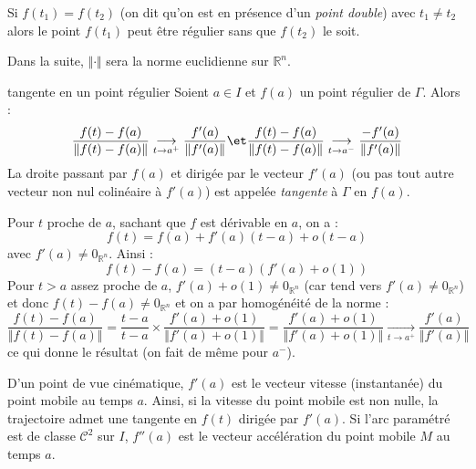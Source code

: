 \documentclass[french,11pt,twoside]{VcCours}
\begin{document}
\begin{Remarque}[\alerte]{}
	Si $f(t_1) = f(t_2)$ (on dit qu'on est en présence d'un \emph{point double}) avec $t_1 \neq t_2$ alors le point $f(t_1)$ peut être régulier sans que $f(t_2)$ le soit.
\end{Remarque}

\medskip

Dans la suite, $\Vert \cdot \Vert$ sera la norme euclidienne sur $\mathbb{R}^n$.

\medskip

\begin{TheoremeDefinition}{tangente en un point régulier}
Soient $a \in I$ et $f(a)$ un point régulier de $\Gamma$. Alors :
$$ \dfrac{f(t)-f(a)}{\Vert f(t)-f(a) \Vert} \underset{t \rightarrow a^+}{\longrightarrow} \frac{f'(a)}{\Vert f'(a) \Vert} \et  \dfrac{f(t)-f(a)}{\Vert f(t)-f(a) \Vert} \underset{t \rightarrow a^-}{\longrightarrow} \frac{-f'(a)}{\Vert f'(a) \Vert}$$
La droite passant par $f(a)$ et dirigée par le vecteur $f'(a)$ (ou pas tout autre vecteur non nul colinéaire à $f'(a)$) est appelée \emph{tangente} à $\Gamma$ en $f(a)$.
\end{TheoremeDefinition}

\begin{Demonstration}{} Pour $t$ proche de $a$, sachant que $f$ est dérivable en $a$, on a :
$$ f(t)=f(a)+f'(a)(t-a)+o(t-a)$$
avec $f'(a) \neq 0_{\mathbb{R}^n}$. Ainsi :
$$ f(t)-f(a)= (t-a) (f'(a)+o(1))$$
Pour $t>a$ assez proche de $a$, $f'(a)+o(1) \neq  0_{\mathbb{R}^n}$ (car tend vers $f'(a) \neq  0_{\mathbb{R}^n}$) et donc $f(t)-f(a) \neq  0_{\mathbb{R}^n}$ et on a par homogénéité de la norme :
$$  \dfrac{f(t)-f(a)}{\Vert f(t)-f(a) \Vert} = \frac{t-a}{t-a} \times \frac{f'(a)+o(1)}{\Vert f'(a)+o(1)\Vert} = \frac{f'(a)+o(1)}{\Vert f'(a)+o(1)\Vert} \underset{t \rightarrow  a^+}{\longrightarrow} \frac{f'(a)}{\Vert f'(a) \Vert}$$
ce qui donne le résultat (on fait de même pour $a^{-}$).
\end{Demonstration}

\medskip

\begin{Remarque}{}
D'un point de vue cinématique, $f'(a)$ est le vecteur vitesse (instantanée) du point mobile au temps $a$. Ainsi, si la vitesse du point mobile est non nulle, la trajectoire  admet une tangente en $f(t)$ dirigée par $f'(a)$. Si l'arc paramétré est de classe $\mathcal{C}^2$ sur $I$, $f''(a)$ est le vecteur accélération du point mobile $M$ au temps $a$.
\end{Remarque}
\end{document}
